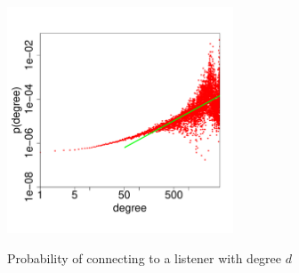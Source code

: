 \begin{figure}[htb]

\centering
{\includegraphics[width=0.6\textwidth]{PA-tutto-cut.pdf}}

\caption{Probability of connecting to a listener with degree $d$}
\label{PA-All}
\end{figure}

